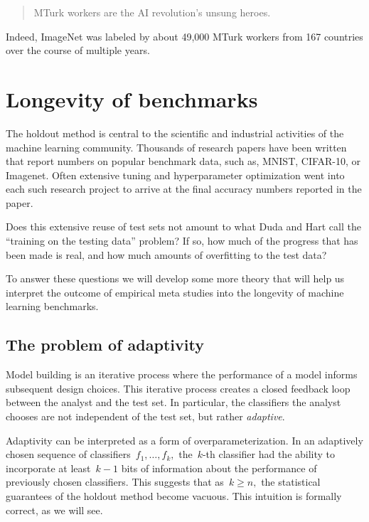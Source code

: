\documentclass{tufte-book}
\begin{document}
\begin{quote}
MTurk workers are the AI revolution's unsung heroes.
\end{quote}

Indeed, ImageNet was labeled by about 49,000 MTurk workers from 167
countries over the course of multiple years.

\hypertarget{longevity-of-benchmarks}{%
\section{Longevity of benchmarks}\label{longevity-of-benchmarks}}

The holdout method is central to the scientific and industrial
activities of the machine learning community. Thousands of research
papers have been written that report numbers on popular benchmark data,
such as, MNIST, CIFAR-10, or Imagenet. Often extensive tuning and
hyperparameter optimization went into each such research project to
arrive at the final accuracy numbers reported in the paper.

Does this extensive reuse of test sets not amount to what Duda and Hart
call the ``training on the testing data'' problem? If so, how much of
the progress that has been made is real, and how much amounts of
overfitting to the test data?

To answer these questions we will develop some more theory that will
help us interpret the outcome of empirical meta studies into the
longevity of machine learning benchmarks.

\hypertarget{the-problem-of-adaptivity}{%
\subsection{The problem of adaptivity}\label{the-problem-of-adaptivity}}

Model building is an iterative process where the performance of a model
informs subsequent design choices. This iterative process creates a
closed feedback loop between the analyst and the test set. In
particular, the classifiers the analyst chooses are not independent of
the test set, but rather
\emph{adaptive}.

Adaptivity can be interpreted as a form of overparameterization. In an
adaptively chosen sequence of classifiers~\(f_1,\dots,f_k,\)
the~\(k\)-th classifier had the ability to incorporate at least~\(k-1\)
bits of information about the performance of previously chosen
classifiers. This suggests that as~\(k\ge n,\) the statistical
guarantees of the holdout method become vacuous. This intuition is
formally correct, as we will see.
\end{document}
